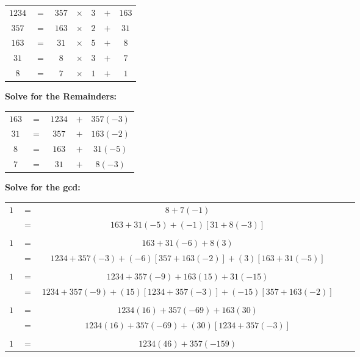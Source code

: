 \documentclass{article}
\numberwithin{equation}{subsection}
\begin{document}
	\begin{tabular}{c c c c c c c}
		$1234$	&	$=$	&	$357$	&	$\times$	&	\underline{$3$}	&	$+$	&	\underline{$163$}	\\
		$357$	&	$=$	&	$163$	&	$\times$	&	\underline{$2$}	&	$+$	&	\underline{$31$}	\\
		$163$	&	$=$	&	$31$	&	$\times$	&	\underline{$5$}	&	$+$	&	\underline{$8$}	\\
		$31$	&	$=$	&	$8$	&	$\times$	&	\underline{$3$}	&	$+$	&	\underline{$7$}	\\
		$8$	&	$=$	&	$7$	&	$\times$	&	\underline{$1$}	&	$+$	&	\underline{$1$}	\\
	\end{tabular}

	\vspace{15pt}
	\textbf{Solve for the Remainders:}

	\begin{tabular}{c c c c c}
		$163$	&	$=$	&	$1234$	&	$+$	&	$357(-3)$	\\
		$31$	&	$=$	&	$357$	&	$+$	&	$163(-2)$	\\
		$8$	&	$=$	&	$163$	&	$+$	&	$31(-5)$	\\
		$7$	&	$=$	&	$31$	&	$+$	&	$8(-3)$	\\
	\end{tabular}

	\vspace{15pt}
	\textbf{Solve for the gcd:}
	
	\begin{center}
		\begin{tabular}{c c c c c}
			$1$	&	$=$	&	$8+7(-1)$	\\
					&	$=$	&	$163+31(-5) + (-1)[31+8(-3)]$	\\\\
			$1$	&	$=$	&	$163+31(-6)+8(3)$	\\
				&	$=$	&	$1234+357(-3) + (-6)[357+163(-2)] + (3)[163+31(-5)]$	\\\\
			$1$	&	$=$	&	$1234+357(-9) + 163(15) + 31(-15)$	\\
					&	$=$	&	$1234 + 357(-9) + (15)[1234+357(-3)]+ (-15)[357+163(-2)]$ \\\\
			$1$	&	$=$	&	$1234(16) + 357(-69) + 163(30)$	\\
					&	$=$	&	$1234(16) + 357(-69) + (30)[1234+357(-3)]$	\\\\
			$1$	&	$=$	&	$1234(46) + 357(-159)$	\\
		\end{tabular}
	\end{center}
\end{document}
